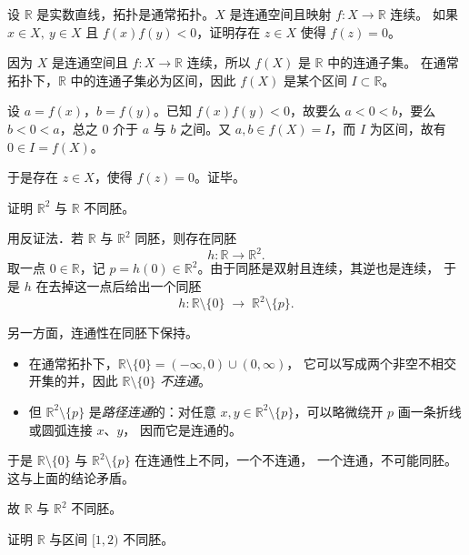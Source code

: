 \begin{homework}[4.6]
设 $\mathbb{R}$ 是实数直线，拓扑是通常拓扑。$X$ 是连通空间且映射  
$f: X \to \mathbb{R}$ 连续。  
如果 $x\in X,\ y\in X$ 且 $f(x)f(y)<0$，证明存在 $z\in X$ 使得 $f(z)=0$。
\end{homework}
\begin{solution}
因为 $X$ 是连通空间且 $f:X\to\mathbb{R}$ 连续，所以 $f(X)$ 是 $\mathbb{R}$ 中的连通子集。
在通常拓扑下，$\mathbb{R}$ 中的连通子集必为区间，因此 $f(X)$ 是某个区间 $I\subset\mathbb{R}$。

设 $a=f(x)$，$b=f(y)$。已知 $f(x)f(y)<0$，故要么 $a<0<b$，要么 $b<0<a$，总之 $0$ 介于 $a$ 与 $b$
之间。又 $a,b\in f(X)=I$，而 $I$ 为区间，故有 $0\in I=f(X)$。

于是存在 $z\in X$，使得 $f(z)=0$。证毕。
\end{solution}
\begin{homework}[4.7]
证明 $\mathbb{R}^2$ 与 $\mathbb{R}$ 不同胚。
\end{homework}
\begin{solution}
用反证法．若 $\mathbb{R}$ 与 $\mathbb{R}^2$ 同胚，则存在同胚
\[
h:\mathbb{R}\longrightarrow\mathbb{R}^2 .
\]
取一点 $0\in\mathbb{R}$，记 $p=h(0)\in\mathbb{R}^2$。由于同胚是双射且连续，其逆也是连续，
于是 $h$ 在去掉这一点后给出一个同胚
\[
h:\mathbb{R}\setminus\{0\}\;\longrightarrow\;\mathbb{R}^2\setminus\{p\}.
\]

另一方面，连通性在同胚下保持。

\begin{itemize}
  \item 在通常拓扑下，$\mathbb{R}\setminus\{0\}=(-\infty,0)\cup(0,\infty)$，
  它可以写成两个非空不相交开集的并，因此 \(\mathbb{R}\setminus\{0\}\) \emph{不连通}。
  \item 但 $\mathbb{R}^2\setminus\{p\}$ 是\emph{路径连通}的：对任意
        $x,y\in\mathbb{R}^2\setminus\{p\}$，可以略微绕开 $p$ 画一条折线或圆弧连接 $x$、$y$，
        因而它是连通的。
\end{itemize}

于是 $\mathbb{R}\setminus\{0\}$ 与 $\mathbb{R}^2\setminus\{p\}$ 在连通性上不同，一个不连通，
一个连通，不可能同胚。这与上面的结论矛盾。

故 $\mathbb{R}$ 与 $\mathbb{R}^2$ 不同胚。
\end{solution}
\begin{homework}[4.8]
证明 $\mathbb{R}$ 与区间 $[1,2)$ 不同胚。
\end{homework}
